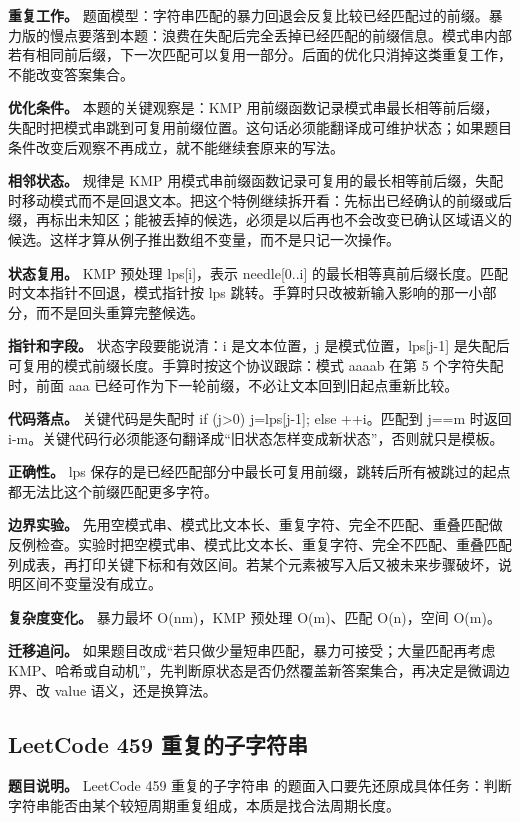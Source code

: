 \textbf{重复工作。} 题面模型：字符串匹配的暴力回退会反复比较已经匹配过的前缀。暴力版的慢点要落到本题：浪费在失配后完全丢掉已经匹配的前缀信息。模式串内部若有相同前后缀，下一次匹配可以复用一部分。后面的优化只消掉这类重复工作，不能改变答案集合。

\textbf{优化条件。} 本题的关键观察是：KMP 用前缀函数记录模式串最长相等前后缀，失配时把模式串跳到可复用前缀位置。这句话必须能翻译成可维护状态；如果题目条件改变后观察不再成立，就不能继续套原来的写法。

\textbf{相邻状态。} 规律是 KMP 用模式串前缀函数记录可复用的最长相等前后缀，失配时移动模式而不是回退文本。把这个特例继续拆开看：先标出已经确认的前缀或后缀，再标出未知区；能被丢掉的候选，必须是以后再也不会改变已确认区域语义的候选。这样才算从例子推出数组不变量，而不是只记一次操作。

\textbf{状态复用。} KMP 预处理 lps[i]，表示 needle[0..i] 的最长相等真前后缀长度。匹配时文本指针不回退，模式指针按 lps 跳转。手算时只改被新输入影响的那一小部分，而不是回头重算完整候选。

\textbf{指针和字段。} 状态字段要能说清：i 是文本位置，j 是模式位置，lps[j-1] 是失配后可复用的模式前缀长度。手算时按这个协议跟踪：模式 aaaab 在第 5 个字符失配时，前面 aaa 已经可作为下一轮前缀，不必让文本回到旧起点重新比较。

\textbf{代码落点。} 关键代码是失配时 if (j>0) j=lps[j-1]; else ++i。匹配到 j==m 时返回 i-m。关键代码行必须能逐句翻译成“旧状态怎样变成新状态”，否则就只是模板。

\textbf{正确性。} lps 保存的是已经匹配部分中最长可复用前缀，跳转后所有被跳过的起点都无法比这个前缀匹配更多字符。

\textbf{边界实验。} 先用空模式串、模式比文本长、重复字符、完全不匹配、重叠匹配做反例检查。实验时把空模式串、模式比文本长、重复字符、完全不匹配、重叠匹配列成表，再打印关键下标和有效区间。若某个元素被写入后又被未来步骤破坏，说明区间不变量没有成立。

\textbf{复杂度变化。} 暴力最坏 O(nm)，KMP 预处理 O(m)、匹配 O(n)，空间 O(m)。

\textbf{迁移追问。} 如果题目改成“若只做少量短串匹配，暴力可接受；大量匹配再考虑 KMP、哈希或自动机”，先判断原状态是否仍然覆盖新答案集合，再决定是微调边界、改 value 语义，还是换算法。

\subsection{LeetCode 459 重复的子字符串}

\textbf{题目说明。} LeetCode 459 重复的子字符串 的题面入口要先还原成具体任务：判断字符串能否由某个较短周期重复组成，本质是找合法周期长度。

